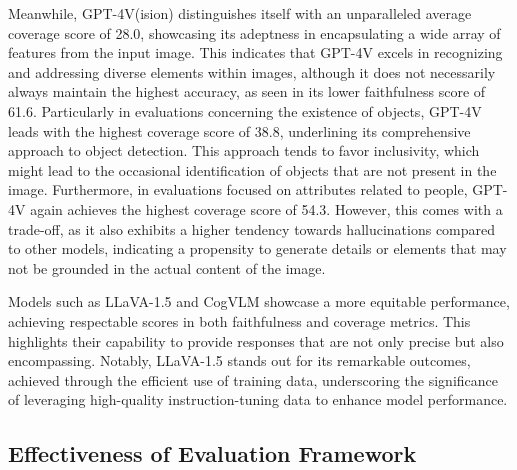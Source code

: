 Meanwhile, GPT-4V(ision) distinguishes itself with an unparalleled average coverage score of 28.0, showcasing its adeptness in encapsulating a wide array of features from the input image. This indicates that GPT-4V excels in recognizing and addressing diverse elements within images, although it does not necessarily always maintain the highest accuracy, as seen in its lower faithfulness score of 61.6. Particularly in evaluations concerning the existence of objects, GPT-4V leads with the highest coverage score of 38.8, underlining its comprehensive approach to object detection. This approach tends to favor inclusivity, which might lead to the occasional identification of objects that are not present in the image. Furthermore, in evaluations focused on attributes related to people, GPT-4V again achieves the highest coverage score of 54.3. However, this comes with a trade-off, as it also exhibits a higher tendency towards hallucinations compared to other models, indicating a propensity to generate details or elements that may not be grounded in the actual content of the image.

Models such as LLaVA-1.5 and CogVLM showcase a more equitable performance, achieving respectable scores in both faithfulness and coverage metrics. This highlights their capability to provide responses that are not only precise but also encompassing. Notably, LLaVA-1.5 stands out for its remarkable outcomes, achieved through the efficient use of training data, underscoring the significance of leveraging high-quality instruction-tuning data to enhance model performance.

\vspace{-1mm}
\subsection{Effectiveness of Evaluation Framework}
\label{subsec:exp_metric}
\vspace{-1mm}

\begin{table}[t]
\small
\centering
{}
\vspace{-2mm}
\caption{Pearson correlation ($\rho$) between our GPT-4-based evaluation framework \eval~ and human judgements.}
\vspace{-6mm}
\label{tab:human correlation}
\end{table}

